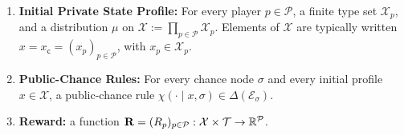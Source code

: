 \documentclass[12pt, a4paper]{article}
\begin{document}
\begin{definition}
\begin{enumerate}[label =(\roman*)]
    \item \textbf{Initial Private State Profile:} For every player $p\in \mathcal P$, a finite type set $\mathcal X_p$, and a distribution $\mu$ on $\mathcal X:=\prod_{p\in\mathcal P}\mathcal X_p$.
    Elements of $\mathcal X$ are typically written $x= x_{\mathsf c} = (x_p)_{p \in \mathcal P}$, with $x_p\in\mathcal X_p$.

    \item \textbf{Public-Chance Rules:} For every chance node $\sigma$ and every initial profile $x \in \mathcal{X}$, a public-chance rule $\chi(\cdot \mid x, \sigma)\in \Delta(\mathcal E_\sigma)$.

    \item \textbf{Reward:} a function $\mathbf{R} = (R_p)_{p \in \mathcal{P}}: \mathcal{X} \times \mathcal{T}\to\mathbb{R}^{\mathcal{P}}$.
\end{enumerate}
\end{definition}
\end{document}
